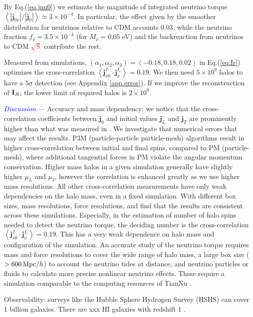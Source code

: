 \documentclass[aps,prd,twocolumn,amsmath,amssymb,amsfont,superscriptaddress]{revtex4-1}
\newcommand{\bs}{\boldsymbol}
\newcommand{\I}{\bold{I}}
\newcommand{\spin}{\bs{j}}
\newcommand{\tcb}{\textcolor{blue}}
\newcommand{\tcr}{\textcolor{red}}
\begin{document}
By Eq.(\ref{eq.jnu0}) we estimate the magnitude of integrated neutrino torque $\left\langle|\spin_{0\nu}|/|\spin_0|\right\rangle\simeq 3\times10^{-4}$. In particular, the effect given by the smoother distribution for neutrinos relative to CDM accounts 0.03, while the neutrino fraction $f_\nu=3.5\times 10^{-3}$ (for $M_\nu=0.05$ eV) and the backreaction from neutrinos to CDM \tcr{$\sqrt{8}$} contribute the rest.

Measured from simulations, $(\alpha_1,\alpha_2,\alpha_3)=(-0.18,0.18,0.02)$ in Eq.(\ref{eq.Ir}) optimizes the cross-correlation $\left\langle\spin^I_{\nu 0}\cdot\spin^{I_r}_\nu\right\rangle=0.19$. We then need $5\times 10^9$ halos to have a $5\sigma$ detection (see Appendix \ref{app.error}). If we improve the reconstruction of $\I_R$, the lower limit of required halos is $2\times 10^8$.

\tcb{\textit{Discussion.---}} 
Accuracy and mass dependency: we notice that the cross-correlation coefficients between $\spin_0$ and initial values $\spin_L$ and $\spin_T$ are prominently higher than what was measured in \citep{2000ApJ...532L...5L}. We investigate that numerical errors that may affect the results. P3M (particle-particle particle-mesh) algorithms result in higher cross-correlation between initial and final spins, compared to PM (particle-mesh), where additional tangential forces in PM violate the angular momentum conservation. Higher mass halos in a given simulation generally have slightly higher $\mu_L$ and $\mu_I$, however the correlation is enhanced greatly as we use higher mass resolutions. All other cross-correlation measurements have only weak dependencies on the halo mass, even in a fixed simulation. With different box sizes, mass resolutions, force resolutions, and find that the results are consistent across these simulations. Especially, in the estimation of number of halo spins needed to detect the neutrino torque, the deciding number is the cross-correlation $\left\langle\spin^I_{\nu 0}\cdot\spin^{I_r}_\nu\right\rangle=0.19$. This has a very weak dependence on halo mass and configuration of the simulation. An accurate study of the neutrino torque requires mass and force resolutions to cover the wide range of halo mass, a large box size ($>600\,{\rm Mpc}/h$) to account the neutrino tides at distance, and neutrino particles or fluids to calculate more precise nonlinear neutrino effects. These require a simulation comparable to the computing resources of TianNu \citep{2017RAA....17...85E}.

Observability: surveys like the Hubble Sphere Hydrogen Survey (HSHS) \citep{2006astro.ph..6104P} can cover 1 billion galaxies. There are xxx HI galaxies with redshift 1 \citep{2004MNRAS.350.1210Z}.
\end{document}
